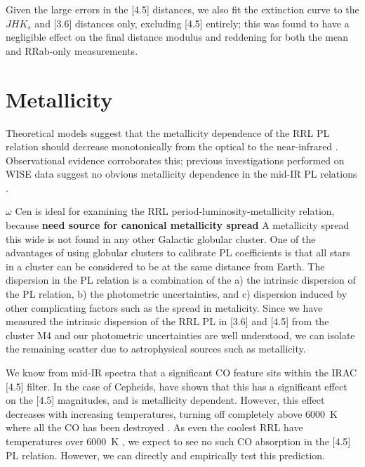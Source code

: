 \documentclass[a4paper,fleqn,usenatbib]{mnras}
\begin{document}
Given the large errors in the [4.5] distances, we also fit the extinction curve to the $JHK_s$ and [3.6] distances only, excluding [4.5] entirely; this was found to have a negligible effect on the final distance modulus and reddening for both the mean and RRab-only measurements.

\section{Metallicity}
\label{sec:metallicity}

Theoretical models suggest that the metallicity dependence of the RRL PL relation should decrease monotonically from the optical to the near-infrared \citep{2001MNRAS.326.1183B, 2004ApJS..154..633C}. Observational evidence corroborates this; previous investigations performed on WISE data suggest no obvious metallicity dependence in the mid-IR PL relations \citep{2013ApJ...776..135M}.

$\omega$ Cen is ideal for examining the RRL period-luminosity-metallicity relation, because {\bf need source for canonical metallicity spread}
A metallicity spread this wide is not found in any other Galactic globular cluster. One of the advantages of using globular clusters to calibrate PL coefficients is that all stars in a cluster can be considered to be at the same distance from Earth. The dispersion in the PL relation is a combination of the a) the intrinsic dispersion of the PL relation, b) the photometric uncertainties, and c) dispersion induced by other complicating factors such as the spread in metalicity. Since we have measured the intrinsic dispersion of the RRL PL in [3.6] and [4.5] from the cluster M4 \citep{2015ApJ...808...11N} and our photometric uncertainties are well understood, we can isolate the remaining scatter due to astrophysical sources such as metallicity. %

We know from mid-IR spectra that a significant CO feature sits within the IRAC [4.5] filter. In the case of Cepheids, \citet{2012ApJ...759..146M} have shown that this has a significant effect on the [4.5] magnitudes, and is metallicity dependent. However, this effect decreases with increasing temperatures, turning off completely above 6000~K where all the CO has been destroyed \citep{2012ApJ...759..146M}. As even the coolest RRL have temperatures over 6000~K \citep{1971PASP...83..697I}, we expect to see no such CO absorption in the [4.5] PL relation. However, we can directly and empirically test this prediction. %
\end{document}
